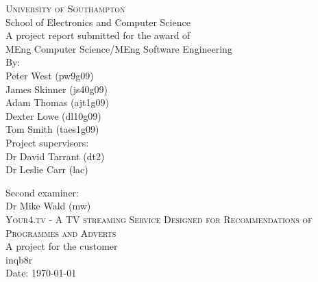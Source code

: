 
\begin{titlepage}

\begin{center}

\textsc{\large{University of Southampton}}\\[0.0cm]

\large{School of Electronics and Computer Science}\\[2.0cm]

\large{A project report submitted for the award of}\\[0.0cm]

\large{MEng Computer Science/MEng Software Engineering}\\[2.0cm]

\large{
	By: \\
	Peter West (pw9g09) \\
	James Skinner (js40g09) \\
	Adam Thomas (ajt1g09) \\
	Dexter Lowe (dl10g09) \\
	Tom Smith (taes1g09)}\\[2.0cm]

\large{Project supervisors: \\
		Dr David Tarrant (dt2) \\
		Dr Leslie Carr (lac)}

\large{Second examiner: \\
		Dr Mike Wald (mw)}\\[2.0cm]


\textsc{\large Your4.tv - A TV streaming Service Designed for Recommendations of Programmes and Adverts}\\[2.0cm]

\large{A project for the customer \\
		inqb8r}\\[2.0cm]

\large{Date: \today}\\[4.0cm]

\end{center}

\end{titlepage}

